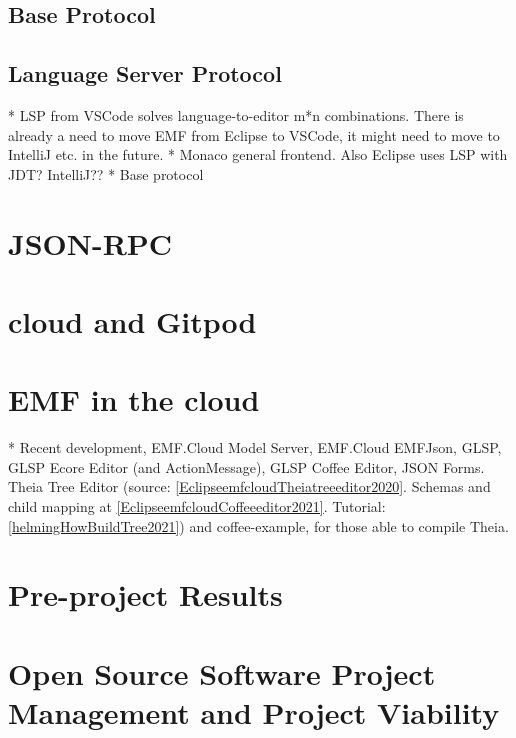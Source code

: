 \subsection{Base Protocol}\label{sec:base-protocol}

\subsection{Language Server Protocol}
* LSP from VSCode solves language-to-editor m*n combinations. There is already a need to move EMF from Eclipse to VSCode, it might need to move to IntelliJ etc. in the future.
* Monaco general frontend. Also Eclipse uses LSP with JDT? IntelliJ??
* Base protocol 

\section{JSON-RPC}

\section{\Gls{cloud} and \gls{Gitpod}}




\section{\acrlong{EMF} in the \Gls{cloud}}\label{sec:emf-in-cloud}
* Recent development, EMF.Cloud Model Server, EMF.Cloud EMFJson, GLSP, GLSP Ecore Editor (and ActionMessage\label{par:glsp-actionmessage}), GLSP Coffee Editor, JSON Forms.
Theia Tree Editor\label{par:theia-tree-editor} (source: \cref{EclipseemfcloudTheiatreeeditor2020}. Schemas and child mapping at \cref{EclipseemfcloudCoffeeeditor2021}. Tutorial: \cref{helmingHowBuildTree2021}) and coffee-example, for those able to compile Theia.

\section{Pre-project Results}




\section{Open Source Software Project Management and Project Viability}

